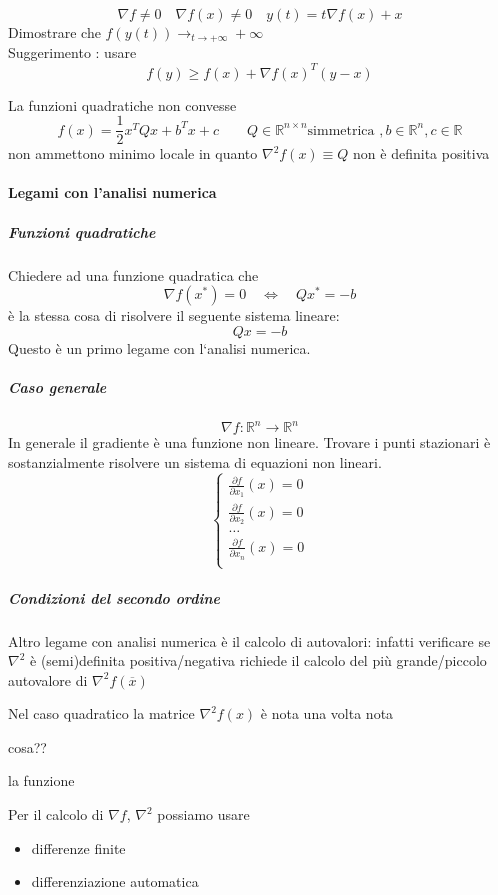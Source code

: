 \begin{exercise}
$$\nabla f \neq 0 \quad \nabla f(x) \neq 0 \quad y(t) = t \nabla f(x) + x$$
Dimostrare che $f(y(t)) \rightarrow_{t\rightarrow +\infty} + \infty$  \\
Suggerimento : usare
$$ f(y) \geq f(x) + \nabla f(x)^{T} (y-x)$$
\end{exercise}

\begin{observation}
La funzioni quadratiche non convesse
 $$f(x) = \frac{1}{2} x^{T} Qx + b^Tx + c \qquad Q \in \mathbb{R}^{n \times n} \text {simmetrica }, b \in \mathbb{R}^{n}, c \in \mathbb{R} $$
non ammettono minimo locale in quanto
$\nabla^{2}f(x) \equiv Q$ non \`e definita positiva
\end{observation}
\paragraph{Legami con l'analisi numerica}

\subparagraph{Funzioni quadratiche}
 Chiedere ad una funzione quadratica che
    $$ \nabla f(x^{*})=0 \quad \Longleftrightarrow \quad Q x^{*} = -b $$
   è la stessa cosa di risolvere il seguente sistema lineare:
 $$Qx = -b$$
Questo è un primo legame con l`analisi numerica. \\

\subparagraph{Caso generale}
$$ \nabla f : \mathbb{R}^{n} \rightarrow \mathbb{R}^{n}$$
In generale il gradiente è una funzione non lineare. Trovare i punti stazionari è sostanzialmente risolvere un sistema
di equazioni non lineari.
$$
\left\{
\begin{array}{l}
\frac{\partial f}{\partial x_1} (x) = 0 \\
 \frac{\partial f}{\partial x_2} (x) = 0 \\
 \ldots  \\
 \frac{\partial f}{\partial x_n} (x) = 0 \\
\end{array}
\right.
$$

\subparagraph{Condizioni del secondo ordine}
Altro legame con analisi numerica è il calcolo di autovalori:
infatti verificare se $\nabla^{2}$ \`e (semi)definita
positiva/negativa richiede il calcolo del 
pi\`u grande/piccolo autovalore di $\nabla^{2}f(\overline{x})$
\begin{notes}
Nel caso quadratico la matrice $\nabla^{2}f(x)$ \`e 
nota una volta nota 
\begin{todo}
cosa??
\end{todo}
la funzione
\end{notes}
Per il calcolo di $\nabla f$, $\nabla^{2}$ possiamo usare
\begin{itemize}
\item differenze finite
\item differenziazione automatica
\end{itemize}

\outbpdocument








